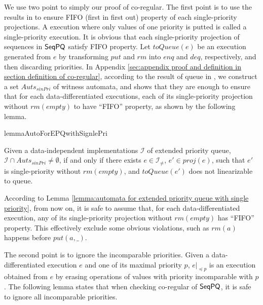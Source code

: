We use two point to simply our proof of co-regular. The first point is to use the results in \cite{Bouajjani:2015} to ensure FIFO (first in first out) property of each single-priority projections. A execution where only values of one priority is putted is called a single-priority execution. It is obvious that each single-priority projection of sequences in $\mathsf{SeqPQ}$ satisfy FIFO property. Let $\textit{toQueue}(e)$ be an execution generated from $e$ by transforming $\textit{put}$ and $\textit{rm}$ into $\textit{enq}$ and $\textit{deq}$, respectively, and then discarding priorities. In Appendix \ref{sec:appendix proof and definition in section definition of co-regular}, according to the result of queue in \cite{Bouajjani:2015}, we construct a set $\textit{Auts}_{\textit{sinPri}}$ of witness automata, and shows that they are enough to ensure that for each data-differentiated executions, each of its single-priority projection without $\textit{rm}(\textit{empty})$ to have ``FIFO'' property, as shown by the following lemma.

\begin{restatable}{lemma}{AutoForEPQwithSignlePri}
\label{lemma:automata for extended priority queue with single priority}

Given a data-independent implementations $\mathcal{I}$ of extended priority queue, $\mathcal{I} \cap \textit{Auts}_{\textit{sinPri}} \neq \emptyset$, if and only if there exists $e \in \mathcal{I}_{\neq}$, $e' \in \textit{proj}(e)$, such that $e'$ is single-priority  without $\textit{rm}(\textit{empty})$, and $\textit{toQueue}(e')$ does not linearizable to queue.
\end{restatable}

According to Lemma \ref{lemma:automata for extended priority queue with single priority}, from now on, it is safe to assume that, for each data-differentiated execution, any of its single-priority projection without $\textit{rm}(\textit{empty})$ has ``FIFO'' property. This effectively exclude some obvious violations, such as $\textit{rm}(a)$ happens before $\textit{put}(a,\_)$.

The second point is to ignore the incomparable priorities. Given a data-differentiated execution $e$ and one of its maximal priority $p$, $e\vert_{\preceq p}$ is an execution obtained from $e$ by erasing operations of values with priority incomparable with $p$. The following lemma states that when checking co-regular of $\mathsf{SeqPQ}$, it is safe to ignore all incomparable priorities.

